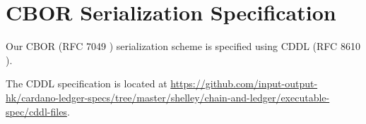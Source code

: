 \section{CBOR Serialization Specification}
\label{sec:cddl}

Our CBOR (RFC 7049 \cite{rfcCBOR})
serialization scheme is specified using
CDDL (RFC 8610 \cite{rfcCDDL}).

The CDDL specification is located at
\url{https://github.com/input-output-hk/cardano-ledger-specs/tree/master/shelley/chain-and-ledger/executable-spec/cddl-files}.

% 
